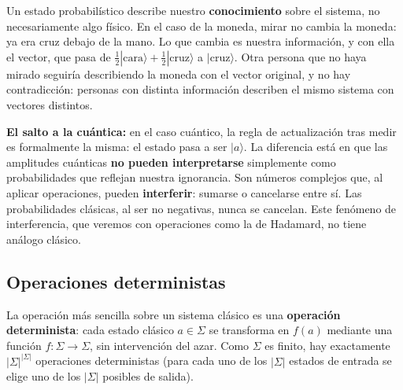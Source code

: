 \documentclass[11pt, a4paper, twoside, openright]{report}
\begin{document}
\begin{tcolorbox}[colback=blue!5!white,colframe=blue!75!black,title=\textbf{Aclaración: El cambio de estado tras la medición}]
Un estado probabilístico describe nuestro \textbf{conocimiento} sobre el sistema, no necesariamente algo físico. En el caso de la moneda, mirar no cambia la moneda: ya era cruz debajo de la mano. Lo que cambia es nuestra información, y con ella el vector, que pasa de $\frac{1}{2}|\text{cara}\rangle + \frac{1}{2}|\text{cruz}\rangle$ a $|\text{cruz}\rangle$. Otra persona que no haya mirado seguiría describiendo la moneda con el vector original, y no hay contradicción: personas con distinta información describen el mismo sistema con vectores distintos.

\textbf{El salto a la cuántica:} en el caso cuántico, la regla de actualización tras medir es formalmente la misma: el estado pasa a ser $|a\rangle$. La diferencia está en que las amplitudes cuánticas \textbf{no pueden interpretarse} simplemente como probabilidades que reflejan nuestra ignorancia. Son números complejos que, al aplicar operaciones, pueden \textbf{interferir}: sumarse o cancelarse entre sí. Las probabilidades clásicas, al ser no negativas, nunca se cancelan. Este fenómeno de interferencia, que veremos con operaciones como la de Hadamard, no tiene análogo clásico.
\end{tcolorbox}

\subsection{Operaciones deterministas}

\noindent La operación más sencilla sobre un sistema clásico es una \textbf{operación determinista}: cada estado clásico $a \in \Sigma$ se transforma en $f(a)$ mediante una función $f : \Sigma \to \Sigma$, sin intervención del azar. Como $\Sigma$ es finito, hay exactamente $|\Sigma|^{|\Sigma|}$ operaciones deterministas (para cada uno de los $|\Sigma|$ estados de entrada se elige uno de los $|\Sigma|$ posibles de salida).
\end{document}

